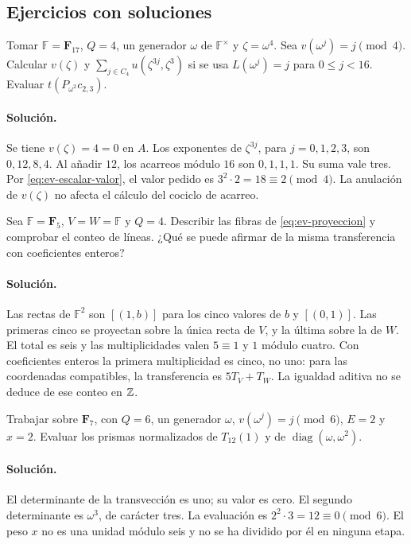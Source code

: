 \subsection{Ejercicios con soluciones}

\begin{ejercicio}
Tomar $\mathbb F=\mathbf F_{17}$, $Q=4$, un generador $\omega$ de $\mathbb F^\times$ y $\zeta=\omega^4$. Sea $v(\omega^j)=j\pmod4$. Calcular $v(\zeta)$ y $\sum_{j\in C_4}u(\zeta^{3j},\zeta^3)$ si se usa $L(\omega^j)=j$ para $0\le j<16$. Evaluar $t(P_{\omega^2}c_{2,3})$.
\end{ejercicio}
\paragraph{Solución.} Se tiene $v(\zeta)=4=0$ en $A$. Los exponentes de $\zeta^{3j}$, para $j=0,1,2,3$, son $0,12,8,4$. Al añadir $12$, los acarreos módulo $16$ son $0,1,1,1$. Su suma vale tres. Por \eqref{eq:ev-escalar-valor}, el valor pedido es $3^2\cdot2=18\equiv2\pmod4$. La anulación de $v(\zeta)$ no afecta el cálculo del cociclo de acarreo.

\begin{ejercicio}
Sea $\mathbb F=\mathbf F_5$, $V=W=\mathbb F$ y $Q=4$. Describir las fibras de \eqref{eq:ev-proyeccion} y comprobar el conteo de líneas. ¿Qué se puede afirmar de la misma transferencia con coeficientes enteros?
\end{ejercicio}
\paragraph{Solución.} Las rectas de $\mathbb F^2$ son $[(1,b)]$ para los cinco valores de $b$ y $[(0,1)]$. Las primeras cinco se proyectan sobre la única recta de $V$, y la última sobre la de $W$. El total es seis y las multiplicidades valen $5\equiv1$ y $1$ módulo cuatro. Con coeficientes enteros la primera multiplicidad es cinco, no uno: para las coordenadas compatibles, la transferencia es $5T_V+T_W$. La igualdad aditiva no se deduce de ese conteo en $\mathbb{Z}$.

\begin{ejercicio}
Trabajar sobre $\mathbf F_7$, con $Q=6$, un generador $\omega$, $v(\omega^j)=j\pmod6$, $E=2$ y $x=2$. Evaluar los prismas normalizados de $T_{12}(1)$ y de $\operatorname{diag}(\omega,\omega^2)$.
\end{ejercicio}
\paragraph{Solución.} El determinante de la transvección es uno; su valor es cero. El segundo determinante es $\omega^3$, de carácter tres. La evaluación es $2^2\cdot3=12\equiv0\pmod6$. El peso $x$ no es una unidad módulo seis y no se ha dividido por él en ninguna etapa.

